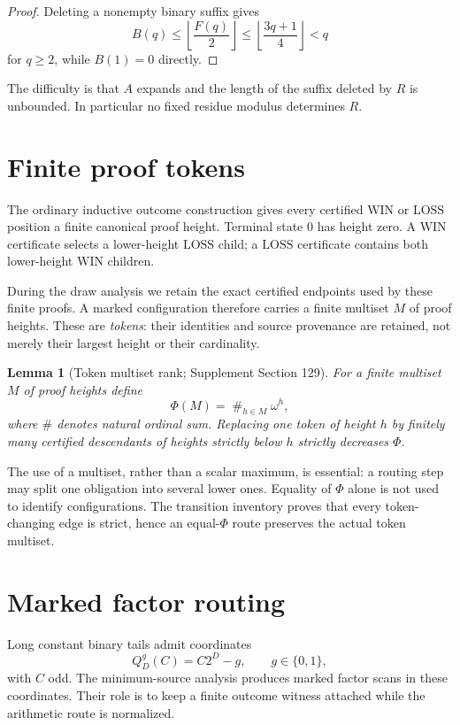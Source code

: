 \documentclass[11pt]{article}
\newtheorem{lemma}[theorem]{Lemma}
\newcommand{\WIN}{\mathrm{WIN}}
\newcommand{\LOSS}{\mathrm{LOSS}}
\begin{document}
\begin{proof}
Deleting a nonempty binary suffix gives
\[
B(q)\le \left\lfloor\frac{F(q)}2\right\rfloor
\le \left\lfloor\frac{3q+1}{4}\right\rfloor<q
\]
for $q\ge2$, while $B(1)=0$ directly.
\end{proof}

The difficulty is that $A$ expands and the length of the suffix deleted by
$R$ is unbounded. In particular no fixed residue modulus determines $R$.

\section{Finite proof tokens}

The ordinary inductive outcome construction gives every certified $\WIN$ or
$\LOSS$ position a finite canonical proof height. Terminal state $0$ has
height zero. A $\WIN$ certificate selects a lower-height $\LOSS$ child; a
$\LOSS$ certificate contains both lower-height $\WIN$ children.

During the draw analysis we retain the exact certified endpoints used by
these finite proofs. A marked configuration therefore carries a finite
multiset $M$ of proof heights. These are \emph{tokens}: their identities and
source provenance are retained, not merely their largest height or their
cardinality.

\begin{lemma}[Token multiset rank; Supplement Section 129]
For a finite multiset $M$ of proof heights define
\[
  \Phi(M)=\mathop{\#}_{h\in M}\omega^h,
\]
where $\#$ denotes natural ordinal sum. Replacing one token of height $h$ by
finitely many certified descendants of heights strictly below $h$ strictly
decreases $\Phi$.
\end{lemma}

The use of a multiset, rather than a scalar maximum, is essential: a routing
step may split one obligation into several lower ones. Equality of $\Phi$
alone is not used to identify configurations. The transition inventory proves
that every token-changing edge is strict, hence an equal-$\Phi$ route
preserves the actual token multiset.

\section{Marked factor routing}

Long constant binary tails admit coordinates
\[
 Q_D^g(C)=C2^D-g,
 \qquad g\in\{0,1\},
\]
with $C$ odd. The minimum-source analysis produces marked factor scans in
these coordinates. Their role is to keep a finite outcome witness attached
while the arithmetic route is normalized.
\end{document}
